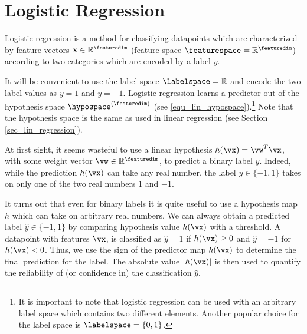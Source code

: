 \documentclass[12pt]{report}
\begin{document}
\begin{center}
\end{center}



\section{Logistic Regression} 
\label{sec_LogReg}

Logistic regression is a method for classifying datapoints which 
are characterized by feature vectors $\mathbf{x} \in \mathbb{R}^{\featuredim}$ 
(feature space $\featurespace=\mathbb{R}^{\featuredim}$) 
according to two categories which are encoded by a label $y$. 

It will be convenient to use the label space $\labelspace = \mathbb{R}$ 
and encode the two label values as $y=1$ and $y=-1$. Logistic regression 
learns a predictor out of the hypothesis space $\hypospace^{(\featuredim)}$ 
(see \eqref{equ_lin_hypospace}).\footnote{It is important to note that logistic 
regression can be used with an arbitrary label space which contains 
two different elements. Another popular choice for the label space is $\labelspace=\{0,1\}$.} 
Note that the hypothesis space is the same as used in linear regression (see Section \ref{sec_lin_regression}). 

At first sight, it seems wasteful to use a linear hypothesis $h(\vx) = \vw^T \vx$, 
with some weight vector $\vw \in \mathbb{R}^{\featuredim}$, to predict a 
binary label $y$. Indeed, while the prediction $h(\vx)$ can take any real number, 
the label $y \in \{-1,1\}$ takes on only one of the two real numbers $1$ and $-1$. 

It turns out that even for binary labels it is quite useful to use 
a hypothesis map $h$ which can take on arbitrary real numbers. 
We can always obtain a predicted label $\hat{y} \in \{-1,1\}$ by comparing 
hypothesis value $h(\vx)$ with a threshold. A datapoint with features $\vx$, 
is classified as $\hat{y}=1$ if $h(\vx)\geq 0$ and $\hat{y}=-1$ for $h(\vx)< 0$. 
Thus, we use the sign of the predictor map $h(\vx)$ to determine the 
final prediction for the label. The absolute value $|h(\vx)|$ is then used 
to quantify the reliability of (or confidence in) the classification $\hat{y}$. 
\end{document}
